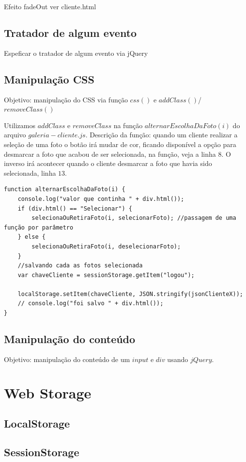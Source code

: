 Efeito fadeOut ver cliente.html


\subsection{Tratador de algum evento}
Espeficar o tratador de algum evento via jQuery
\subsection{Manipulação CSS}
	Objetivo: manipulação do CSS via função $css()$ e $addClass()$/$removeClass()$

	Utilizamos $addClass$ e $removeClass$ na função $alternarEscolhaDaFoto(i)$ do arquivo $galeria-cliente.js$. 
	Descrição da função: quando um cliente realizar a seleção de uma foto o botão irá mudar de cor, ficando disponível a opção para desmarcar a foto que acabou de ser selecionada, na função, veja a linha $8$. O inverso irá acontecer quando o cliente desmarcar a foto que havia sido selecionada, linha $13$.
	

\begin{lstlisting}
function alternarEscolhaDaFoto(i) {
    console.log("valor que continha " + div.html());
    if (div.html() == "Selecionar") {
        selecionaOuRetiraFoto(i, selecionarFoto); //passagem de uma função por parâmetro
    } else {
        selecionaOuRetiraFoto(i, deselecionarFoto);
    }
    //salvando cada as fotos selecionada
    var chaveCliente = sessionStorage.getItem("logou");

    localStorage.setItem(chaveCliente, JSON.stringify(jsonClienteX));
    // console.log("foi salvo " + div.html());
}
\end{lstlisting}

\subsection{Manipulação do conteúdo}
	Objetivo: manipulação do conteúdo de um $input$ e $div$ usando $jQuery$.

\section{Web Storage }
\subsection{LocalStorage}

\subsection{SessionStorage}

